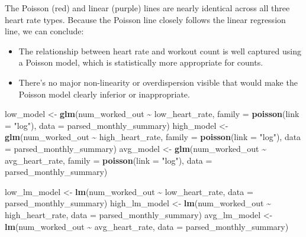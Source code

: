 \documentclass[
  11pt,
]{article}
\newenvironment{Shaded}{\begin{snugshade}}{\end{snugshade}}
\newcommand{\AttributeTok}[1]{\textcolor[rgb]{0.13,0.29,0.53}{#1}}
\newcommand{\FunctionTok}[1]{\textcolor[rgb]{0.13,0.29,0.53}{\textbf{#1}}}
\newcommand{\NormalTok}[1]{#1}
\newcommand{\OtherTok}[1]{\textcolor[rgb]{0.56,0.35,0.01}{#1}}
\newcommand{\SpecialCharTok}[1]{\textcolor[rgb]{0.81,0.36,0.00}{\textbf{#1}}}
\newcommand{\StringTok}[1]{\textcolor[rgb]{0.31,0.60,0.02}{#1}}
\providecommand{\tightlist}{%
  \setlength{\itemsep}{0pt}\setlength{\parskip}{0pt}}
\begin{document}
The Poisson (red) and linear (purple) lines are nearly identical across
all three heart rate types. Because the Poisson line closely follows the
linear regression line, we can conclude:

\begin{itemize}
\tightlist
\item
  The relationship between heart rate and workout count is well captured
  using a Poisson model, which is statistically more appropriate for
  counts.
\item
  There's no major non-linearity or overdispersion visible that would
  make the Poisson model clearly inferior or inappropriate.
\end{itemize}

\begin{Shaded}
\begin{Highlighting}[]
\NormalTok{low\_model }\OtherTok{\textless{}{-}} \FunctionTok{glm}\NormalTok{(num\_worked\_out }\SpecialCharTok{\textasciitilde{}}\NormalTok{ low\_heart\_rate, }\AttributeTok{family =} \FunctionTok{poisson}\NormalTok{(}\AttributeTok{link =} \StringTok{"log"}\NormalTok{), }
                 \AttributeTok{data =}\NormalTok{ parsed\_monthly\_summary)}
\NormalTok{high\_model }\OtherTok{\textless{}{-}} \FunctionTok{glm}\NormalTok{(num\_worked\_out }\SpecialCharTok{\textasciitilde{}}\NormalTok{ high\_heart\_rate, }\AttributeTok{family =} \FunctionTok{poisson}\NormalTok{(}\AttributeTok{link =} \StringTok{"log"}\NormalTok{), }
                  \AttributeTok{data =}\NormalTok{ parsed\_monthly\_summary)}
\NormalTok{avg\_model }\OtherTok{\textless{}{-}} \FunctionTok{glm}\NormalTok{(num\_worked\_out }\SpecialCharTok{\textasciitilde{}}\NormalTok{ avg\_heart\_rate, }\AttributeTok{family =} \FunctionTok{poisson}\NormalTok{(}\AttributeTok{link =} \StringTok{"log"}\NormalTok{), }
                 \AttributeTok{data =}\NormalTok{ parsed\_monthly\_summary)}

\NormalTok{low\_lm\_model }\OtherTok{\textless{}{-}} \FunctionTok{lm}\NormalTok{(num\_worked\_out }\SpecialCharTok{\textasciitilde{}}\NormalTok{ low\_heart\_rate, }\AttributeTok{data =}\NormalTok{ parsed\_monthly\_summary)}
\NormalTok{high\_lm\_model }\OtherTok{\textless{}{-}} \FunctionTok{lm}\NormalTok{(num\_worked\_out }\SpecialCharTok{\textasciitilde{}}\NormalTok{ high\_heart\_rate, }\AttributeTok{data =}\NormalTok{ parsed\_monthly\_summary)}
\NormalTok{avg\_lm\_model }\OtherTok{\textless{}{-}} \FunctionTok{lm}\NormalTok{(num\_worked\_out }\SpecialCharTok{\textasciitilde{}}\NormalTok{ avg\_heart\_rate, }\AttributeTok{data =}\NormalTok{ parsed\_monthly\_summary)}
\end{Highlighting}
\end{Shaded}
\end{document}
